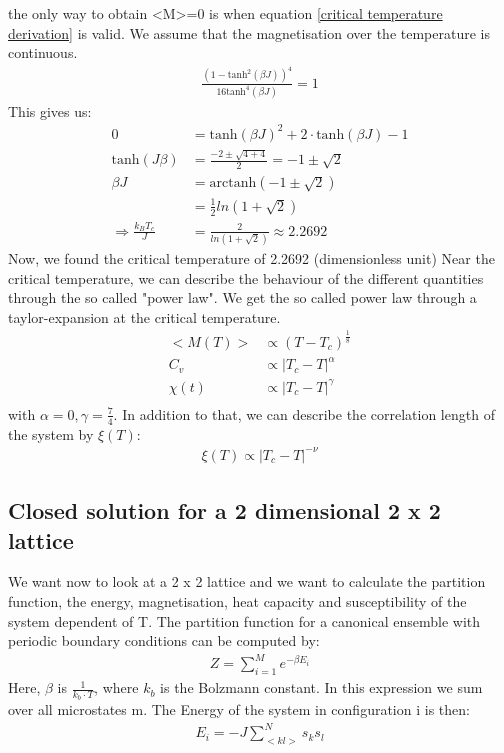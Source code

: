 \documentclass[10pt,a4paper]{article}
\begin{document}
the only way to obtain <M>=0 is when equation \ref{critical temperature derivation} is valid. We assume that the magnetisation over the temperature is continuous. 
\begin{align}
\frac{(1 - \mathrm{tanh}^2(\beta J))^{4}}{16\mathrm{tanh}^{4}(\beta J)} = 1 \label{critical temperature derivation}
\end{align}
This gives us:
\begin{align}
0&=\mathrm{tanh}(\beta J )^2+2 \cdot \mathrm{tanh}(\beta J ) -1 \\
\mathrm{tanh}(J \beta ) &= \frac{-2 \pm \sqrt{4+4}}{2} = -1 \pm \sqrt{2}\\
\beta J &= \mathrm{arctanh}(-1 \pm \sqrt{2})\\
&= \frac{1}{2} ln(1+\sqrt{2})\\
\Rightarrow \frac {k_B T_c}{J} &= \frac{2}{ln(1+\sqrt{2})}\approx 2.2692
\end{align}
Now, we found the critical temperature of 2.2692 (dimensionless unit)
Near the critical temperature, we can describe the behaviour of the different quantities through the so called "power law". We get the so called power law through   a taylor-expansion at the critical temperature. 
\begin{align}
<M(T)> & \propto (T-T_c)^{\frac{1}{8}}\\
C_v & \propto \left| T_c - T \right|^{\alpha}\\
\chi ( t)& \propto \left| T_c - T \right|^{\gamma}\\
\end{align}
with $\alpha=0, \gamma=\frac{7}{4} $. In addition to that, we can describe the correlation length of the system by $\xi(T) $:
\begin{align}
\xi (T) \propto \left| T_c - T \right|^{-\nu}
\end{align}

\subsection{Closed solution for a 2 dimensional 2 x 2 lattice \label{closed_solution}}

We want now to look at a 2 x 2 lattice and we want to calculate the partition function, the energy, magnetisation, heat capacity and susceptibility of the system  dependent of T. 
The partition function for a canonical ensemble with periodic boundary conditions can be computed  by:
\begin{align}
Z= \sum_{i=1}^{M} e^{- \beta E_i}
\end{align} 
Here, $\beta$ is $\frac{1}{k_b \cdot T}$, where $k_b$ is the Bolzmann constant. 
In this expression we sum over all microstates m. The Energy of the system in configuration i is then:
\begin{align}
E_i = - J \sum_{<kl>}^N s_k s_l 
\end{align} 
\end{document}

